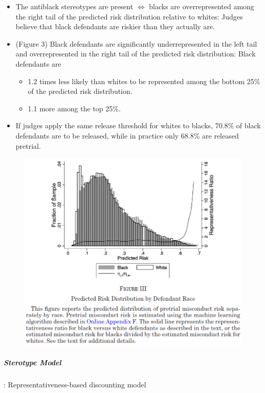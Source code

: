 \documentclass[../root]{subfiles}
\begin{document}
    \begin{itemize}
      \item The antiblack stereotypes are present $\Leftrightarrow$ blacks are overrepresented among the right tail of the predicted risk distribution relative to whites: Judges believe that black defendants are riskier than they actually are.
      \item (Figure 3) Black defendants are significantly underrepresented in the left tail and overrepresented in the right tail of the predicted risk distribution: Black defendants are
      \begin{itemize}
        \item 1.2 times less likely than whites to be represented among the bottom 25\% of the predicted risk distribution.
        \item 1.1 more among the top 25\%.
      \end{itemize}
      \item If judges apply the same release threshold for whites to blacks,  70.8\% of black defendants are to be released, while in practice only 68.8\% are released pretrial.
    \end{itemize}

    \begin{figure}[h]
      \centering
      \includegraphics[scale = .7]{os0707tanji/ADY_F3}
    \end{figure}

    \newpage

    \subparagraph{Sterotype Model}: Representativeness-based discounting model
\end{document}

